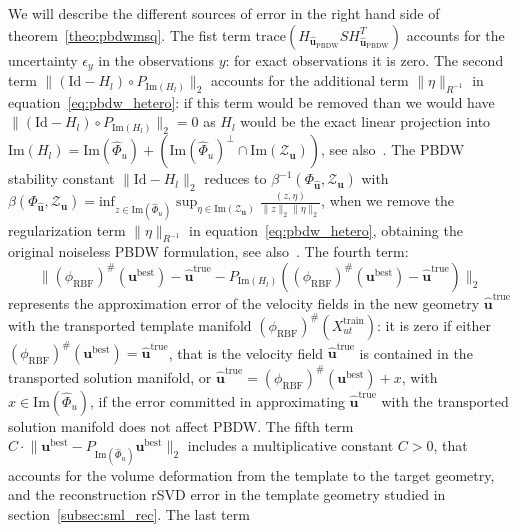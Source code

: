 \begin{rmk}
  We will describe the different sources of error in the right hand side of theorem~\ref{theo:pbdwmsq}. The fist term $\text{trace}(H_{\widehat{\mathbf{u}}_{\text{PBDW}}}SH_{\widehat{\mathbf{u}}_{\text{PBDW}}}^T)$ accounts for the uncertainty $\epsilon_y$ in the observations $y$: for exact observations it is zero.
  The second term $\lVert(\text{Id}-H_l)\circ P_{\text{Im}(H_l)}\rVert_2$ accounts for the additional term $\lVert \eta\rVert_{R^{-1}}$ in equation~\ref{eq:pbdw_hetero}: if this term would be removed than we would have $\lVert(\text{Id}-H_l)\circ P_{\text{Im}(H_l)}\rVert_2=0$ as $H_l$ would be the exact linear projection into $\text{Im}(H_l) = \text{Im}(\widehat{\Phi}_{u})+\left(\text{Im}(\widehat{\Phi}_{u})^{\perp}\cap\text{Im}(\mathcal{Z}_{\mathbf u})\right)$, see also~\cite{gong2019pbdw}.
  The PBDW stability constant $\lVert\text{Id}-H_l\rVert_2$ reduces to $\beta^{-1}(\Phi_{\widehat{\mathbf{u}}},  \mathcal{Z}_{\mathbf u})$ with $\beta(\Phi_{\widehat{\mathbf{u}}},  \mathcal{Z}_{\mathbf u})= \text{inf}_{z\in\text{Im}(\widehat{\Phi}_{u})}\sup_{\eta\in\text{Im}(\mathcal{Z}_{\mathbf u})} \frac{(z,\eta)}{\lVert z\rVert_2\lVert \eta\rVert_2}$, when we remove the regularization term $\lVert \eta\rVert_{R^{-1}}$ in equation~\ref{eq:pbdw_hetero}, obtaining the original noiseless PBDW formulation, see also~\cite{gong2019pbdw}.
  The fourth term:
  \begin{equation*}
    \lVert(\phi_{\text{RBF}})^{\#}({\mathbf u}^{\text{best}})-\widehat{\mathbf{u}}^{\text{true}}-P_{{\text{Im}(H_l)}}((\phi_{\text{RBF}})^{\#}({\mathbf u}^{\text{best}})-\widehat{\mathbf{u}}^{\text{true}})\rVert_2
  \end{equation*}
  represents the approximation error of the velocity fields in the new geometry $\widehat{\mathbf{u}}^{\text{true}}$ with the transported template manifold $(\phi_{\text{RBF}})^{\#}(X^{\text{train}}_{ut})$: it is zero if either $(\phi_{\text{RBF}})^{\#}({\mathbf u}^{\text{best}})=\widehat{\mathbf{u}}^{\text{true}}$, that is the velocity field $\widehat{\mathbf{u}}^{\text{true}}$ is contained in the transported solution manifold, or $\widehat{\mathbf{u}}^{\text{true}}=(\phi_{\text{RBF}})^{\#}({\mathbf u}^{\text{best}})+x$, with $x\in\text{Im}(\widehat{\Phi}_{u})$, if the error committed in approximating $\widehat{\mathbf{u}}^{\text{true}}$ with the transported solution manifold does not affect PBDW.
  The fifth term $C\cdot\lVert {\mathbf u}^{\text{best}}-P_{\text{Im}(\widehat{\Phi}_{u})} {\mathbf u}^{\text{best}}\rVert_2$ includes a multiplicative constant $C>0$, that accounts for the volume deformation from the template to the target geometry, and the reconstruction rSVD error in the template geometry studied in section~\ref{subsec:sml_rec}. The last term

\end{rmk}
